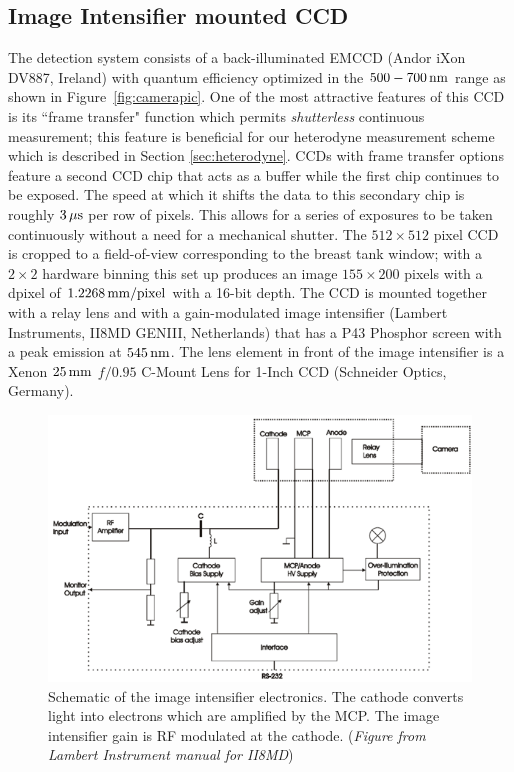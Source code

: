 \subsection{Image Intensifier mounted CCD}
\label{sec:CCD}
The detection system consists of a back-illuminated EMCCD (Andor iXon DV887, Ireland) with quantum efficiency optimized in the $500-700\,{\rm nm}$ range as shown in Figure~\ref{fig:camerapic}. One of the most attractive features of this CCD is its ``frame transfer" function which permits \textit{shutterless} continuous measurement; this feature is beneficial for our heterodyne measurement scheme which is described in Section \ref{sec:heterodyne}. CCDs with frame transfer options feature a second CCD chip that acts as a buffer while the first chip continues to be exposed. The speed at which it shifts the data to this secondary chip is roughly $3\,{\rm \mu s}$ per row of pixels. This allows for a series of exposures to be taken continuously without a need for a mechanical shutter. The $512 \times 512$ pixel CCD is cropped to a field-of-view corresponding to the breast tank window; with a $2 \times 2$ hardware binning this set up produces an image $155 \times 200$ pixels with a dpixel of $1.2268\, {\rm mm/pixel}$ with a 16-bit depth. The CCD is mounted together with a relay lens and with a gain-modulated image intensifier (Lambert Instruments, II8MD GENIII, Netherlands) that has a P43 Phosphor screen with a peak emission at $545\, {\rm nm}$. The lens element in front of the image intensifier is a Xenon $25\,{\rm mm}$ $f/0.95$ C-Mount Lens for 1-Inch CCD (Schneider Optics, Germany).
\begin{figure}[h]
\begin{center}
\includegraphics[width=14cm]{./figures/4_Gen3/iischem.png}
\caption[Schematic of the image intensifier electronics]{Schematic of the image intensifier electronics. The cathode converts light into electrons which are amplified by the MCP. The image intensifier gain is RF modulated at the cathode. (\textit{Figure from Lambert Instrument manual for II8MD})}
\label{fig:iischem}
\end{center}
\end{figure}

